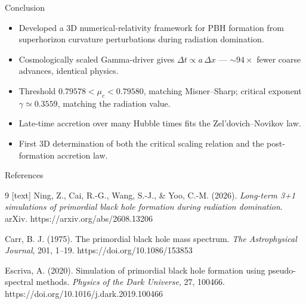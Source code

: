\documentclass[aspectratio=169, 12pt]{beamer}
\begin{document}
\begin{frame}{Conclusion}
	\begin{itemize}
		\item Developed a 3D numerical-relativity framework for PBH formation
		      from superhorizon curvature perturbations during
		      radiation domination.
		\item Cosmologically scaled Gamma-driver gives
		      $\Delta t \propto a\,\Delta x$ — $\sim\!94\times$
		      fewer coarse advances, identical physics.
		\item Threshold $0.79578 < \mu_c < 0.79580$, matching
		      Misner--Sharp; critical exponent
		      $\gamma \simeq 0.3559$, matching the radiation value.
		\item Late-time accretion over many Hubble times fits the Zel'dovich--Novikov law.
		\item First 3D determination of both the critical scaling
		      relation and the post-formation accretion law.
	\end{itemize}
\end{frame}
\begin{frame}[allowframebreaks]{References}
	\begin{thebibliography}{9}
		Ning, Z., Cai, R.-G., Wang, S.-J., \& Yoo, C.-M. (2026).
		\textit{Long-term 3+1 simulations of primordial black hole
		formation during radiation domination}.
		arXiv. https://arxiv.org/abs/2608.13206

		Carr, B. J. (1975).
		The primordial black hole mass spectrum.
		\textit{The Astrophysical Journal}, 201, 1--19.
		https://doi.org/10.1086/153853

		Escriva, A. (2020).
		Simulation of primordial black hole formation using
		pseudo-spectral methods.
		\textit{Physics of the Dark Universe}, 27, 100466.
		https://doi.org/10.1016/j.dark.2019.100466
	\end{thebibliography}
\end{frame}


\end{document}
